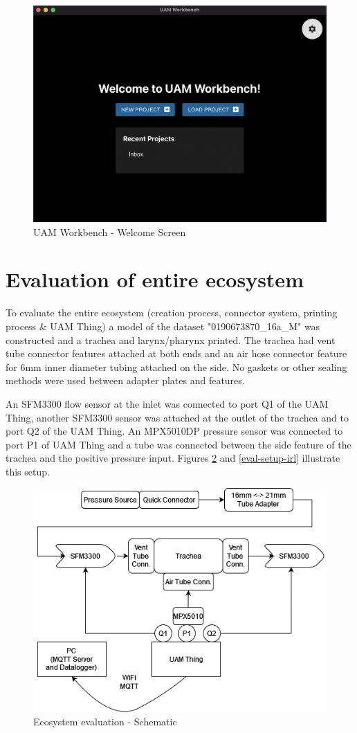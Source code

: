 \documentclass[MME,Projekt,english]{twbook}%
\begin{document}
\begin{figure}[!htbp]
	\centering
	\includegraphics[width=.6\linewidth]{images/uam-workbench.png}
	\caption{UAM Workbench - Welcome Screen}\label{uam-workbench}
\end{figure}

\section{Evaluation of entire ecosystem}

To evaluate the entire ecosystem (creation process, connector system, printing process \& UAM Thing) a model of the dataset
"0190673870\_16a\_M" was constructed and a trachea and larynx/pharynx printed. The trachea had vent tube connector features attached at both ends
and an air hose connector feature for 6mm inner diameter tubing attached on the side. No gaskets or other sealing methods were used between adapter plates and features.

An SFM3300 flow sensor at the inlet was connected to port Q1 of the UAM Thing, another SFM3300 sensor was attached at the outlet of the trachea
and to port Q2 of the UAM Thing. An MPX5010DP pressure sensor was connected to port P1 of UAM Thing and a tube was connected between the side feature
of the trachea and the positive pressure input. Figures \ref{eval-setup} and \ref{eval-setup-irl} illustrate this setup.

\begin{figure}[!htbp]
	\centering
	\includegraphics[width=.6\linewidth]{images/eval-setup.png}
	\caption{Ecosystem evaluation - Schematic}\label{eval-setup}
\end{figure}
\end{document}
